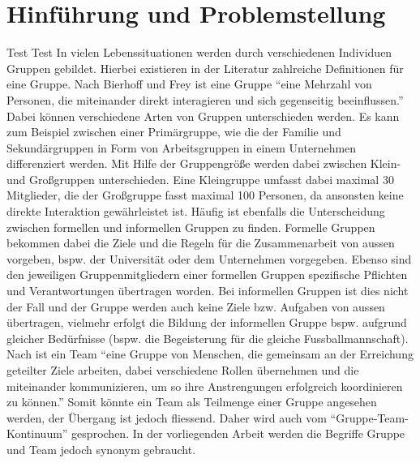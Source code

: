\chapter{Hinführung und Problemstellung}
\label{kap1_hinfuehrung_problemstellung}


Test Test In vielen Lebenssituationen werden durch verschiedenen Individuen Gruppen gebildet. Hierbei existieren in der Literatur zahlreiche Definitionen für eine Gruppe. Nach Bierhoff und Frey ist eine Gruppe “eine Mehrzahl von Personen, die miteinander direkt interagieren und sich gegenseitig beeinflussen.”  \citep[Vgl.][S.~638]{bierhoff_handbuch_2006}
\newline\newline
Dabei können verschiedene Arten von Gruppen unterschieden werden.\citep[Vgl.][S.~11ff.]{thomas_grundris_1991} Es kann zum Beispiel zwischen einer Primärgruppe, wie die der Familie und Sekundärgruppen in Form von Arbeitsgruppen in einem Unternehmen differenziert werden. Mit Hilfe der Gruppengröße werden dabei zwischen Klein- und Großgruppen unterschieden. Eine Kleingruppe umfasst dabei maximal 30 Mitglieder, die der Großgruppe fasst maximal 100 Personen, da ansonsten keine direkte Interaktion gewährleistet ist. 
Häufig ist ebenfalls die Unterscheidung zwischen formellen und informellen Gruppen zu finden. \citep[Vgl.][S.~48]{spies_organisationspsychologie_2010}
Formelle Gruppen bekommen dabei die Ziele und die Regeln für die Zusammenarbeit von aussen vorgeben, bspw. der Universität oder dem Unternehmen vorgegeben. Ebenso sind den jeweiligen Gruppenmitgliedern einer formellen Gruppen spezifische Pflichten und Verantwortungen übertragen worden. Bei informellen Gruppen ist dies nicht der Fall und der Gruppe werden auch keine Ziele bzw. Aufgaben von aussen übertragen, vielmehr erfolgt die Bildung der informellen Gruppe bspw. aufgrund gleicher Bedürfnisse (bspw. die Begeisterung für die gleiche Fussballmannschaft). 
\newline\newline
Nach \citet{dick_teamwork_2013} ist ein Team "`eine Gruppe von Menschen, die gemeinsam an der Erreichung geteilter Ziele arbeiten, dabei verschiedene Rollen übernehmen und die miteinander kommunizieren, um so ihre Anstrengungen erfolgreich koordinieren zu können."' \citep[S.~1]{dick_teamwork_2013} Somit könnte ein Team als Teilmenge einer Gruppe angesehen werden, der Übergang ist jedoch fliessend. Daher wird auch vom "`Gruppe-Team-Kontinuum"' gesprochen.\citep[Vgl.][S.~14]{brettel_erfolgreiche_2009} In der vorliegenden Arbeit werden die Begriffe Gruppe und Team jedoch synonym gebraucht.
